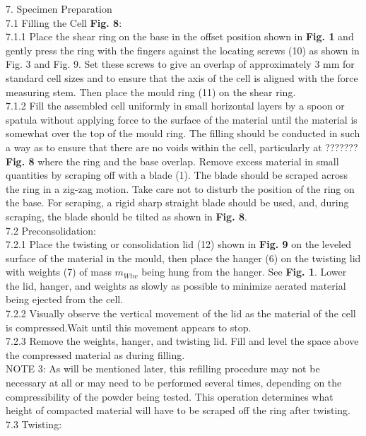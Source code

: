 7. Specimen Preparation \\
7.1 Filling the Cell \textbf{Fig. 8}: \\
7.1.1 Place the shear ring on the base in the offset position shown in \textbf{Fig. 1} and gently press the ring with the fingers against the locating screws (10) as shown in Fig. 3 and Fig. 9. Set these  screws to give an overlap of approximately 3 mm for standard cell sizes and to ensure that the axis of the cell is aligned with the force measuring stem. Then place the mould ring (11) on the shear ring. \\
7.1.2 Fill the assembled cell uniformly in small horizontal layers by a spoon or spatula without applying force to the surface of the material until the material is somewhat over the top of the mould ring. The filling should be conducted in such a way as to ensure that there are no voids within the cell, particularly at ??????? \textbf{Fig. 8} where the ring and the base overlap. Remove excess material in small quantities by scraping off with a blade (1). The blade should be scraped across the ring in a zig-zag motion. Take care not to disturb the position of the ring on the base. For scraping, a rigid sharp  straight blade should be used, and, during scraping, the blade should be tilted as shown in \textbf{Fig. 8}. \\
7.2 Preconsolidation:\\
7.2.1 Place the twisting or consolidation lid (12) shown in \textbf{Fig. 9} on the leveled surface of the material in the mould, then place the hanger (6) on the twisting lid with weights (7) of mass $m_{Wtw}$ being hung from the hanger. See \textbf{Fig. 1}. Lower the lid, hanger, and weights as slowly as possible to minimize aerated material being ejected from the cell. \\
7.2.2 Visually observe the vertical movement of the lid as the material of the cell is compressed.Wait until this movement appears to stop. \\
7.2.3 Remove the weights, hanger, and twisting lid. Fill and level the space above the compressed material as during filling. \\
NOTE 3: As will be mentioned later, this refilling procedure may not be necessary at all or may need to be performed several times, depending on the compressibility of the powder being tested. This operation determines what height of compacted material will have to be scraped off the ring after twisting. \\
7.3 Twisting: \\
